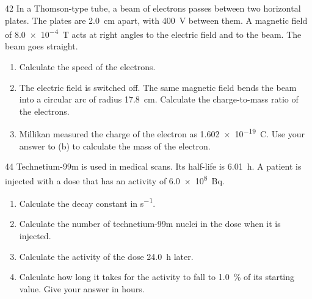 \begin{practiceq}{4}{2}\label{pq:thomson}
In a Thomson-type tube, a beam of electrons passes between two horizontal plates. The plates
are \qty{2.0}{cm} apart, with \qty{400}{V} between them. A magnetic field of
\qty{8.0e-4}{T} acts at right angles to the electric field and to the beam. The beam goes
straight.
\begin{enumerate}[label=(\alph*)]
  \item Calculate the speed of the electrons. 
  \item The electric field is switched off. The same magnetic field bends the beam into a
        circular arc of radius \qty{17.8}{cm}. Calculate the charge-to-mass ratio of the
        electrons. 
  \item Millikan measured the charge of the electron as \qty{1.602e-19}{C}. Use your answer
        to (b) to calculate the mass of the electron. 
\end{enumerate}
\end{practiceq}

\begin{practiceq}{4}{4}\label{pq:technetium}
Technetium-99m is used in medical scans. Its half-life is \qty{6.01}{h}. A patient is
injected with a dose that has an activity of \qty{6.0e8}{Bq}.
\begin{enumerate}[label=(\alph*)]
  \item Calculate the decay constant in \si{s^{-1}}. 
  \item Calculate the number of technetium-99m nuclei in the dose when it is injected.
  \item Calculate the activity of the dose \qty{24.0}{h} later. 
  \item Calculate how long it takes for the activity to fall to \qty{1.0}{\percent} of its
        starting value. Give your answer in hours. 
\end{enumerate}
\end{practiceq}


